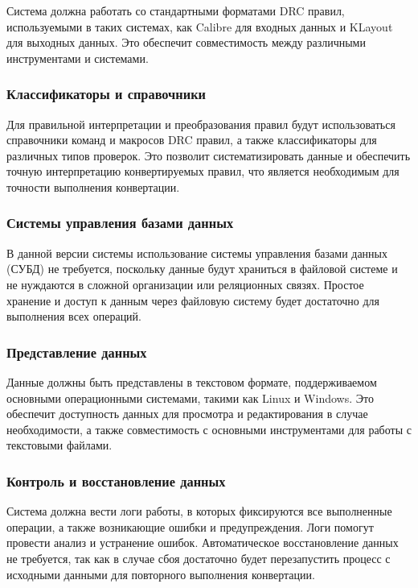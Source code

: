 Система должна работать со стандартными форматами DRC правил,
используемыми в таких системах, как Calibre для входных данных
и KLayout для выходных данных.
Это обеспечит совместимость между различными инструментами и системами.

\subsubsection{Классификаторы и справочники}

Для правильной интерпретации
и преобразования правил будут использоваться справочники команд
и макросов DRC правил, а также классификаторы для различных типов проверок.
Это позволит систематизировать данные
и обеспечить точную интерпретацию конвертируемых правил,
что является необходимым для точности выполнения конвертации.

\subsubsection{Системы управления базами данных}

В данной версии системы использование
системы управления базами данных (СУБД) не требуется,
поскольку данные будут храниться в файловой системе
и не нуждаются в сложной организации или реляционных связях.
Простое хранение и доступ к данным через файловую систему
будет достаточно для выполнения всех операций.

\subsubsection{Представление данных}

Данные должны быть представлены в текстовом формате,
поддерживаемом основными операционными системами,
такими как Linux и Windows.
Это обеспечит доступность данных для просмотра
и редактирования в случае необходимости,
а также совместимость с основными инструментами
для работы с текстовыми файлами.

\subsubsection{Контроль и восстановление данных}

Система должна вести логи работы,
в которых фиксируются все выполненные операции,
а также возникающие ошибки и предупреждения.
Логи помогут провести анализ и устранение ошибок.
Автоматическое восстановление данных не требуется,
так как в случае сбоя достаточно будет перезапустить процесс
с исходными данными для повторного выполнения конвертации.

